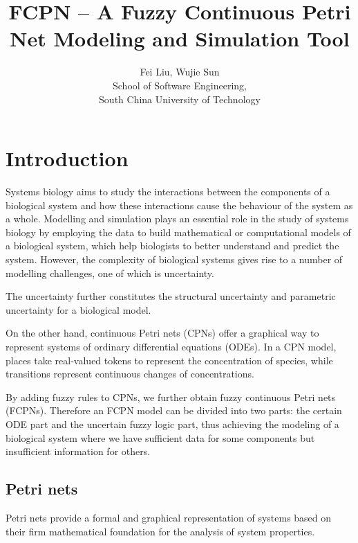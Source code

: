\documentclass[journal,a4paper,onecolumn]{article}
\begin{document}
	\title{FCPN -- A Fuzzy Continuous Petri Net Modeling and Simulation Tool}
	\author{Fei Liu, Wujie Sun\\
	School of Software Engineering, \\South China University of Technology}
\maketitle
\clearpage

\tableofcontents
\clearpage


\section{Introduction}

Systems biology %
aims to study the interactions between the components of a biological system and how these interactions cause the behaviour of the system as a whole. Modelling and simulation plays an essential role in the study of systems biology by employing the data to build mathematical or computational models of a biological system, which help biologists to better understand and predict the system. However, the complexity of biological systems gives rise to a number of modelling challenges, one of which is uncertainty. %

The uncertainty further constitutes the structural uncertainty and parametric uncertainty for a biological model.

On the other hand, continuous Petri nets (CPNs) offer a graphical way to represent systems of ordinary differential equations (ODEs). %
In a CPN model, places take real-valued tokens to represent the concentration of species, while transitions represent continuous changes of concentrations. 

By adding fuzzy rules to CPNs, we further obtain fuzzy continuous Petri nets (FCPNs). Therefore an FCPN model can be divided into two parts: the certain ODE part and the uncertain fuzzy logic part, thus achieving the modeling of a biological system where we have sufficient data for some components but insufficient information for others.

\subsection{Petri nets}
Petri nets provide a formal and graphical representation of systems based on their firm mathematical foundation for the analysis of system properties. 
\end{document}
